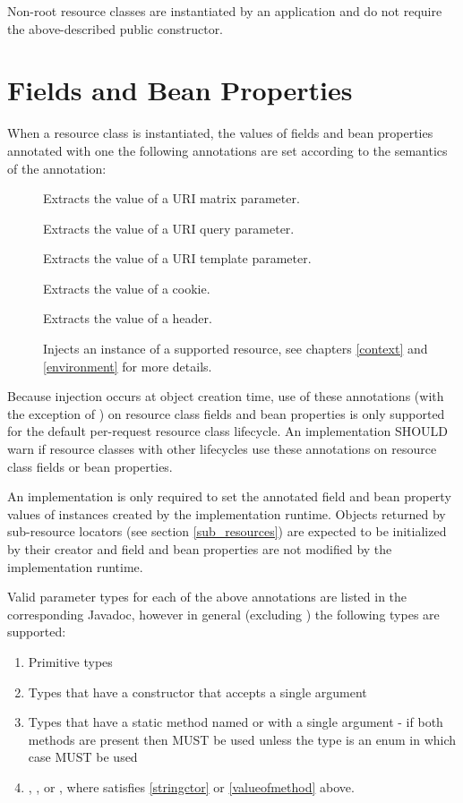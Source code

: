Non-root resource classes are instantiated by an application and do not require the above-described public constructor.

\section{Fields and Bean Properties}
\label{resource_field}

When a resource class is instantiated, the values of fields and bean properties annotated with one the following annotations are set according to the semantics of the annotation:

\begin{description}
\item[\MatrixParam] Extracts the value of a URI matrix parameter.
\item[\QueryParam] Extracts the value of a URI query parameter.
\item[\PathParam] Extracts the value of a URI template parameter.
\item[\CookieParam] Extracts the value of a cookie.
\item[\HeaderParam] Extracts the value of a header.
\item[\Context] Injects an instance of a supported resource, see chapters \ref{context} and \ref{environment} for more details.
\end{description}

Because injection occurs at object creation time, use of these annotations (with the exception of \Context) on resource class fields and bean properties is only supported for the default per-request resource class lifecycle. An implementation SHOULD warn if resource classes with other lifecycles use these annotations on resource class fields or bean properties.

An implementation is only required to set the annotated field and bean property values of instances created by the implementation runtime. Objects returned by sub-resource locators (see section \ref{sub_resources}) are expected to be initialized by their creator and field and bean properties are not modified by the implementation runtime.

Valid parameter types for each of the above annotations are listed in the corresponding Javadoc, however in general (excluding \Context) the following types are supported:

\begin{enumerate}
\item Primitive types
\item\label{stringctor} Types that have a constructor that accepts a single  argument
\item\label{valueofmethod} Types that have a static method named  or  with a single  argument - if both methods are present then  MUST be used unless the type is an enum in which case  MUST be used
\item {}, , or , where  satisfies \ref{stringctor} or \ref{valueofmethod} above.
\end{enumerate}

